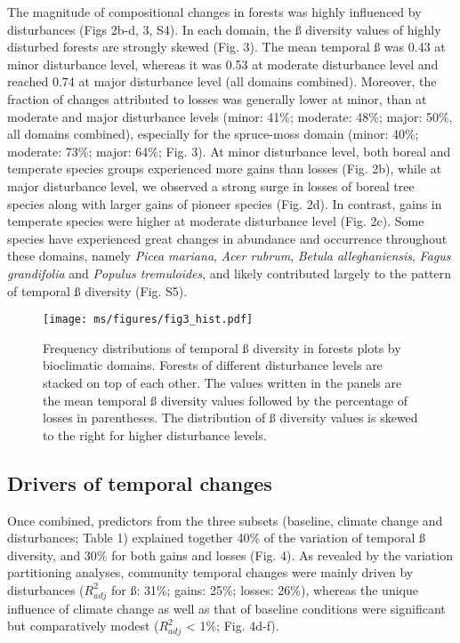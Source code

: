 \documentclass[
  a4paperpaper,
]{article}
\begin{document}
The magnitude of compositional changes in forests was highly influenced
by disturbances (Figs 2b-d, 3, S4). In each domain, the ß diversity
values of highly disturbed forests are strongly skewed (Fig. 3). The
mean temporal ß was 0.43 at minor disturbance level, whereas it was 0.53
at moderate disturbance level and reached 0.74 at major disturbance
level (all domains combined). Moreover, the fraction of changes
attributed to losses was generally lower at minor, than at moderate and
major disturbance levels (minor: 41\%; moderate: 48\%; major: 50\%, all
domains combined), especially for the spruce-moss domain (minor: 40\%;
moderate: 73\%; major: 64\%; Fig. 3). At minor disturbance level, both
boreal and temperate species groups experienced more gains than losses
(Fig. 2b), while at major disturbance level, we observed a strong surge
in losses of boreal tree species along with larger gains of pioneer
species (Fig. 2d). In contrast, gains in temperate species were higher
at moderate disturbance level (Fig. 2c). Some species have experienced
great changes in abundance and occurrence throughout these domains,
namely \emph{Picea mariana}, \emph{Acer rubrum}, \emph{Betula
alleghaniensis}, \emph{Fagus grandifolia} and \emph{Populus
tremuloides}, and likely contributed largely to the pattern of temporal
ß diversity (Fig. S5).

\begin{figure}
\centering
\texttt{[image: ms/figures/fig3\_hist.pdf]}
\caption{Frequency distributions of temporal ß diversity in forests
plots by bioclimatic domains. Forests of different disturbance levels
are stacked on top of each other. The values written in the panels are
the mean temporal ß diversity values followed by the percentage of
losses in parentheses. The distribution of ß diversity values is skewed
to the right for higher disturbance levels.}
\end{figure}

\hypertarget{drivers-of-temporal-changes}{%
\subsection{Drivers of temporal
changes}\label{drivers-of-temporal-changes}}

Once combined, predictors from the three subsets (baseline, climate
change and disturbances; Table 1) explained together 40\% of the
variation of temporal ß diversity, and 30\% for both gains and losses
(Fig. 4). As revealed by the variation partitioning analyses, community
temporal changes were mainly driven by disturbances (\(R^2_{adj}\) for
ß: 31\%; gains: 25\%; losses: 26\%), whereas the unique influence of
climate change as well as that of baseline conditions were significant
but comparatively modest (\(R^2_{adj}\) \textless{} 1\%; Fig. 4d-f).
\end{document}
